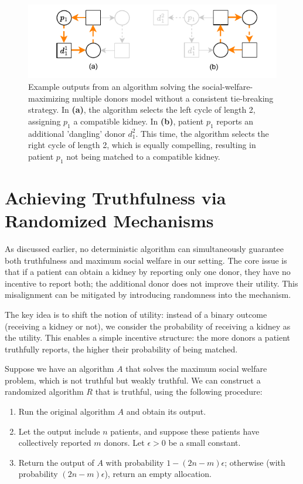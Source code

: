 \begin{figure}
    \centering
    \includegraphics{data/weak_truthfulness.pdf}
    \caption[An example output of an algorithm without a consistent tie-breaking strategy]{Example outputs from an algorithm solving the social-welfare-maximizing multiple donors model without a consistent tie-breaking strategy. In \textbf{(a)}, the algorithm selects the left cycle of length 2, assigning $p_1$ a compatible kidney. In \textbf{(b)}, patient $p_1$ reports an additional 'dangling' donor $d_1^2$. This time, the algorithm selects the right cycle of length 2, which is equally compelling, resulting in patient $p_1$ not being matched to a compatible kidney.}
    \label{fig:weak_truthfulness}
\end{figure}


\section{Achieving Truthfulness via Randomized Mechanisms}

As discussed earlier, no deterministic algorithm can simultaneously guarantee both truthfulness and maximum social welfare in our setting. The core issue is that if a patient can obtain a kidney by reporting only one donor, they have no incentive to report both; the additional donor does not improve their utility. This misalignment can be mitigated by introducing randomness into the mechanism.

The key idea is to shift the notion of utility: instead of a binary outcome (receiving a kidney or not), we consider the probability of receiving a kidney as the utility. This enables a simple incentive structure: the more donors a patient truthfully reports, the higher their probability of being matched.

Suppose we have an algorithm $A$ that solves the maximum social welfare problem, which is not truthful but weakly truthful. We can construct a randomized algorithm $R$ that is truthful, using the following procedure:

\begin{enumerate}
    \item Run the original algorithm $A$ and obtain its output.
    \item Let the output include $n$ patients, and suppose these patients have collectively reported $m$ donors. Let $\epsilon > 0$ be a small constant.
    \item Return the output of $A$ with probability $1 - (2n - m)\epsilon$; otherwise (with probability $(2n - m)\epsilon$), return an empty allocation.
\end{enumerate}

